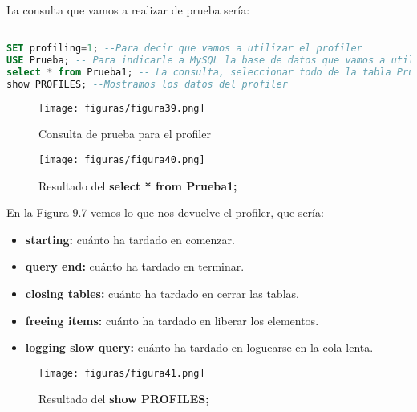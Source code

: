 La consulta que vamos a realizar de prueba sería:\\

\begin{lstlisting}[language=SQL]

SET profiling=1; --Para decir que vamos a utilizar el profiler
USE Prueba; -- Para indicarle a MySQL la base de datos que vamos a utilizar
select * from Prueba1; -- La consulta, seleccionar todo de la tabla Prueba1
show PROFILES; --Mostramos los datos del profiler

\end{lstlisting}
\begin{figure}[H] %
	\centering
	\texttt{[image: figuras/figura39.png]}  %
	\label{figura39}
	
	\caption{Consulta de prueba para el profiler} 
\end{figure}

\begin{figure}[H] %
	\centering
	\texttt{[image: figuras/figura40.png]}  %
	\label{figura40}
	
	\caption{Resultado del \textbf{select * from Prueba1;}} 
\end{figure}

En la Figura 9.7 vemos lo que nos devuelve el profiler, que sería:\\
\begin{itemize}
	\item \textbf{starting: } cuánto ha tardado en comenzar.
	\item \textbf{query end: } cuánto ha tardado en terminar.
	\item \textbf{closing tables: } cuánto ha tardado en cerrar las tablas.
	\item \textbf{freeing items: } cuánto ha tardado en liberar los elementos.
	\item \textbf{logging slow query: } cuánto ha tardado en loguearse en la cola lenta.
\end{itemize}
\begin{figure}[H] %
	\centering
	\texttt{[image: figuras/figura41.png]}  %
	\label{figura41}
	
	\caption{Resultado del \textbf{show PROFILES;}} 
\end{figure}

